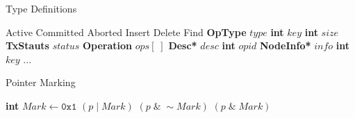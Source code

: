 \documentclass{sig-alternate-05-2015}
\begin{document}
\begin{algorithm}[h]
    \caption{Type Definitions}
    \label{alg:nodestructure}
    \vspace{-0.2in}
    \begin{multicols}{2}
        \begin{algorithmic}[1]
            \State Active
            \State Committed
            \State Aborted
            \EndEnum
            \State Insert
            \State Delete
            \State Find
            \EndEnum
            \State \textbf{OpType} $type$
            \State \textbf{int} $key$
            \EndStruct
            \State \textbf{int} $size$
            \State \textbf{TxStauts} $status$
            \State \textbf{Operation} $ops[\;]$
            \EndStruct
            \State \textbf{Desc*} $desc$
            \State \textbf{int} $opid$
            \EndStruct
            \State \textbf{NodeInfo*} $info$
            \State \textbf{int} $key$
            \State ...
            \EndStruct
            \end{algorithmic}
    \end{multicols}
    \vspace{-0.15in}
\end{algorithm}

\begin{algorithm}[h]
    \caption{Pointer Marking}
    \label{alg:pointermarking}
    \begin{algorithmic}[1]
        \State \textbf{int} $Mark \gets \texttt{0x1}$
         $(p\;|\;Mark)$
        \EndDefine
         $(p\;\&\;\sim Mark)$
        \EndDefine
         $(p\;\&\;Mark)$
        \EndDefine
    \end{algorithmic}
\end{algorithm}

\end{document}
